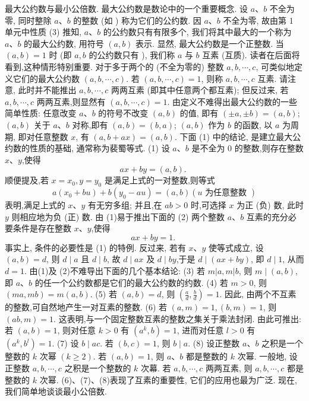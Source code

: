 
最大公约数与最小公倍数.
最大公约数是数论中的一个重要概念.
设 $a 、 b$ 不全为零, 同时整除 $a 、 b$ 的整数 (如  ) 称为它们的公约数.
因 $a 、 b$ 不全为零, 故由第 1 单元中性质 (3) 推知, $a 、 b$ 的公约数只有有限多个, 我们将其中最大的一个称为 $a 、 b$ 的最大公约数, 用符号 $(a, b)$ 表示.
显然, 最大公约数是一个正整数.
当 $(a, b)=1$ 时 (即 $a, b$ 的公约数只有  ), 我们称 $a$ 与 $b$ 互素 (互质). 读者在后面将看到,这种情形特别重要.
对于多于两个的 (不全为零的) 整数 $a, b, \cdots, c$, 可类似地定义它们的最大公约数 $(a, b, \cdots, c)$. 若 $(a, b, \cdots, c)=1$, 则称 $a, b, \cdots, c$ 互素.
请注意, 此时并不能推出 $a, b, \cdots, c$ 两两互素 (即其中任意两个都互素); 但反过来, 若 $a, b, \cdots, c$ 两两互素,则显然有 $(a, b, \cdots, c)=1$.
由定义不难得出最大公约数的一些简单性质:
任意改变 $a 、 b$ 的符号不改变 $(a, b)$ 的值, 即有 $( \pm a, \pm b)=(a, b)$;
$(a, b)$ 关于 $a 、 b$ 对称,即有 $(a, b)=(b, a)$;
$(a, b)$ 作为 $b$ 的函数, 以 $a$ 为周期, 即对任意整数 $x$, 有 $(a, b+a x)=(a, b)$.
下面 (1) 中的结论, 是建立最大公约数的性质的基础, 通常称为裴蜀等式.
(1) 设 $a 、 b$ 是不全为 0 的整数,则存在整数 $x 、 y$,使得
$$
a x+b y=(a, b) \text {. }
$$
顺便提及,若 $x=x_0, y=y_0$ 是满足上式的一对整数,则等式
$$
a\left(x_0+b u\right)+b\left(y_0-a u\right)=(a, b)(u \text { 为任意整数 })
$$
表明,满足上式的 $x 、 y$ 有无穷多组; 并且,在 $a b>0$ 时,可选择 $x$ 为正 (负) 数, 此时 $y$ 则相应地为负 (正) 数.
由 (1)易于推出下面的
(2) 两个整数 $a 、 b$ 互素的充分必要条件是存在整数 $x 、 y$,使得
$$
a x+b y=1 \text {. }
$$
事实上, 条件的必要性是 (1) 的特例.
反过来, 若有 $x 、 y$ 使等式成立, 设 $(a, b)=d$, 则 $d \mid a$ 且 $d \mid b$, 故 $d \mid a x$ 及 $d \mid b y$,于是 $d \mid(a x+b y)$, 即 $d \mid 1$, 从而 $d=1$.
由(1)及 (2)不难导出下面的几个基本结论:
(3) 若 $m|a, m| b$, 则 $m \mid(a, b)$, 即 $a 、 b$ 的任一个公约数都是它们的最大公约数的约数.
(4) 若 $m>0$, 则 $(m a, m b)=m(a, b)$.
(5) 若 $(a, b)=d$, 则 $\left(\frac{a}{d}, \frac{b}{d}\right)=1$. 因此, 由两个不互素的整数,可自然地产生一对互素的整数.
(6) 若 $(a, m)=1,(b, m)=1$, 则 $(a b, m)=1$. 这表明,与一个固定整数互素的整数之集关于乘法封闭.
由此可推出: 若 $(a, b)=1$, 则对任意 $k>0$ 有 $\left(a^k, b\right)=1$, 进而对任意 $l>0$ 有 $\left(a^k, b^l\right)=1$.
(7) 设 $b \mid a c$. 若 $(b, c)=1$, 则 $b \mid a$.
(8) 设正整数 $a 、 b$ 之积是一个整数的 $k$ 次幂 $(k \geqslant 2)$. 若 $(a, b)=1$, 则 $a 、 b$ 都是整数的 $k$ 次幂.
一般地, 设正整数 $a, b, \cdots, c$ 之积是一个整数的 $k$ 次幕.
若 $a, b, \cdots, c$ 两两互素, 则 $a, b, \cdots, c$ 都是整数的 $k$ 次幂.
(6)、(7)、(8)表现了互素的重要性, 它们的应用也最为广泛.
现在, 我们简单地谈谈最小公倍数.
